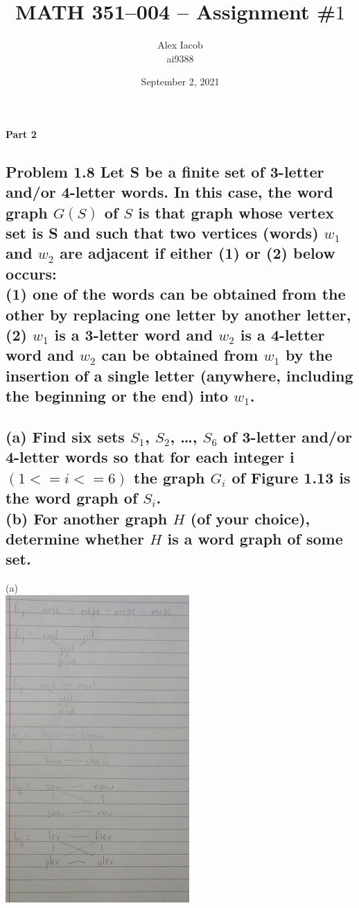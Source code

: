 \documentclass[10pt,a4paper]{article}
\title{MATH 351--004 -- Assignment \#$1$\\
}
\author{Alex Iacob\\
ai9388}
\date{September 2, 2021}
\begin{document}
\maketitle

\begin{center}
{\bf \large Part 2}
\end{center}

\subsection*{Problem 1.8
Let S be a finite set of 3-letter and/or 4-letter words. In this case, the word graph $G(S)$ of $S$ is
that graph whose vertex set is S and such that two vertices (words) $w_{1}$ and $w_{2}$ are adjacent if either (1) or (2) below occurs:\\
(1) one of the words can be obtained from the other by replacing one letter by another letter,\\
(2) $w_{1}$ is a 3-letter word and $w_{2}$ is a 4-letter word and $w_{2}$ can be obtained from $w_{1}$ by the
insertion of a single letter (anywhere, including the beginning or the end) into $w_{1}$.\\
}

\subsection*{
(a) Find six sets $S_{1}$, $S_{2}$, …, $S_{6}$ of 3-letter and/or 4-letter words so that for each integer i $(1 <= i <=6)$ the graph $G_{i}$ of Figure 1.13 is the word graph of $S_{i}$.\\
(b) For another graph $H$ (of your choice), determine whether $H$ is a word graph of some set.\\
}
(a)\\
\includegraphics[width=7cm]{question1.8a}
\end{document}
